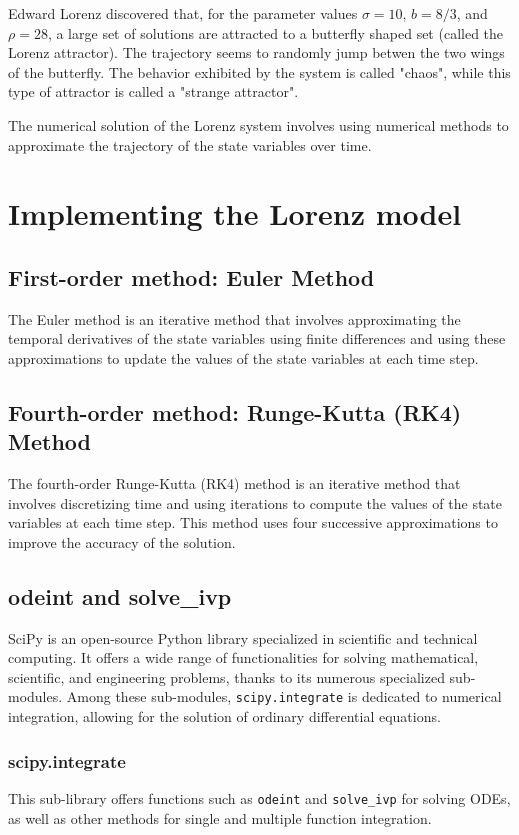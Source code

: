 \documentclass{article}
\begin{document}
   Edward Lorenz discovered that, for the parameter values 
   $\sigma = 10$, $b = 8/3$, and $\rho = 28$, a large set of solutions are attracted to a butterfly shaped set (called the Lorenz attractor). 
   The trajectory seems to randomly jump betwen the two wings of the butterfly. 
   The behavior exhibited by the system is called "chaos", while this type of attractor is called a "strange attractor". 
   
   The numerical solution of the Lorenz system involves using numerical methods to approximate the trajectory of the state variables over time. 
   \section{Implementing the Lorenz model}
   
   \subsection{First-order method: Euler Method}
   The Euler method is an iterative method that involves approximating the temporal derivatives 
   of the state variables using finite differences and using these approximations to update the values of the state variables at each time step. 
   
   \subsection{Fourth-order method: Runge-Kutta (RK4) Method}
   The fourth-order Runge-Kutta (RK4) method is an iterative method that involves discretizing 
   time and using iterations to compute the values of the state variables at each time step. 
   This method uses four successive approximations to improve the accuracy of the solution. 
   
   \subsection{odeint and solve\_ivp}
   SciPy is an open-source Python library specialized in scientific and technical computing. It offers a wide range of functionalities for solving mathematical, scientific, and engineering problems, thanks to its numerous specialized sub-modules. Among these sub-modules, \texttt{scipy.integrate} is dedicated to numerical integration, allowing for the solution of ordinary differential equations.
   \subsubsection{scipy.integrate}
   This sub-library offers functions such as \texttt{odeint} and \texttt{solve\_ivp} for solving ODEs, as well as other methods for single and multiple function integration.
   
\end{document}
